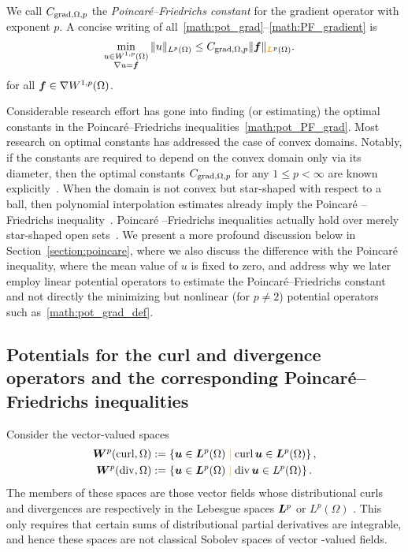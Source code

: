 \documentclass[10pt,letterpaper]{article}
\newcommand\cye[1]{%
  \protect\leavevmode
  \begingroup
    \color{red!35!yellow}%
    #1%
  \endgroup
}
\begin{document}
We call $C_{\operatorname{grad},\Omega,p}$ the \emph{Poincar\'e--Friedrichs constant} for the gradient operator with exponent $p$. \cye{A concise writing of all~\eqref{math:pot_grad}--\eqref{math:PF_gradient} is
\begin{align} \label{math:pot_PF_grad}
    \min\limits_{ \substack{ u \in W^{1,p}(\Omega) \\ \nabla u = \bff } } 
    \| u \|_{L^{p}(\Omega)}
    &\leq 
    C_{\grad,\Omega,p}
    \| \bff \|_{\cye{\bfL}^{p}(\Omega)}.
\end{align}
for all $\bm{f} \in \nabla W^{1,p}(\Omega)$.}

Considerable research effort has gone into finding (or estimating) the optimal constants in the Poincar\'e--Friedrichs inequalities~\eqref{math:pot_PF_grad}. Most research on optimal constants has addressed the case of convex domains. 
Notably, if the constants are required to depend on the convex domain only via its diameter, 
then the optimal constants $C_{\operatorname{grad},\Omega,p}$ for any $1 \leq p < \infty$ are known explicitly~\cite{Pay_Wei_Poin_conv_60,bebendorf2003note,acosta2004optimal,esposito2013poincare,ferone2012remark}.
When the domain is not convex but star-shaped with respect to a ball,
then polynomial interpolation estimates already imply the Poincar\'e\cye{--Friedrichs}  inequality~\cite{brenner2008mathematical,ern2021finite}. 
Poincar\'e\cye{--Friedrichs}  inequalities \cye{actually} hold over \cye{merely} star-shaped open sets~\cite[Theorem~3.1]{hurri1988poincare}. \cye{We present a more profound discussion below in Section~\ref{section:poincare}, where we also discuss the difference with the Poincar\'e inequality, where the mean value of $u$ is fixed to zero, and address why we later employ linear potential operators to estimate the Poincar\'e--Friedrichs constant and not directly the minimizing but nonlinear (for $p \neq 2$) potential operators such as~\eqref{math:pot_grad_def}.} 

\subsection{\cye{Potentials for the curl and divergence operators and the corresponding Poincar\'e--Friedrichs inequalities}} \label{section:intro_curl_div}

Consider the vector-valued spaces
\begin{subequations}\label{equation:W_curl_div_p} \begin{align}
    \bfW^{p}(\curl,\Omega) &:= \left\{ \bfu \in \bfL^{p}(\Omega) \cye{\suchthat} \curl \bfu \in \bfL^{p}(\Omega) \right\}
    ,
    \\
    \bfW^{p}(\divergence,\Omega) &:= \left\{ \bfu \in \bfL^{p}(\Omega) \cye{\suchthat} \divergence \bfu \in L^{p}(\Omega) \right\}
    .
\end{align}\end{subequations}
The members of these spaces are those vector fields whose distributional curls and divergences are \cye{respectively} in \cye{the} Lebesgue spaces \cye{$\bm{L}^{p}$ or $L^{p}(\Omega)$}.  
This only requires that certain sums of distributional partial derivatives are integrable, 
and hence these spaces are not classical Sobolev spaces of vector\cye{-valued} fields. 
\end{document}

